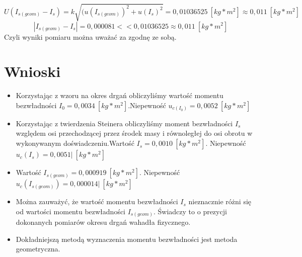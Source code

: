 \documentclass[]{article}
\begin{document}
\[
U(I_{s(geom)} - I_{s}) = k \sqrt{(u(I_{s(geom)})^2 + u( I_{s})^2}
= 0,01036525\:[kg*m^2] \approx 0,011\:[kg*m^2]
\]
\[
|I_{s(geom)} - I_{s}| = 0,000081 << 0,01036525 \approx 0,011\:[kg*m^2]
\]
Czyli wyniki pomiaru można uważać za zgodnę ze sobą.









\section{Wnioski}
\begin{itemize}
        \item Korzystając z wzoru na okres drgań obliczyliśmy wartość momentu bezwładności \(I_{0}=0,0034\:[kg*m^2]\).\newline Niepewność \(u_{c(I_{0})}=0,0052\:[kg*m^2]\)
        
		\item Korzystając z twierdzenia Steinera obliczyliśmy moment bezwładności \(I_{s}\) względem osi przechodzącej przez środek masy i równoległej do osi obrotu w wykonywanym doświadczeniu.\newline Wartość \(I_{s}= 0,0010\: [kg*m^2]\). Niepewność \(u_c(I_{s})=0,0051|\:[kg*m^2]\)
		\item  Wartość \(I_{s(geom)}= 0,000919\: [kg*m^2]\). Niepewność \(u_c(I_{s(geom)})=0,000014|\:[kg*m^2]\)
		\item  Można zauważyć, że wartość momentu bezwładności \(I_{s}\) nieznacznie różni się od wartości momentu bezwładności \(I_{s(geom)}\). Świadczy to o prezycji dokonanych pomiarów okresu drgań wahadła fizycznego.
		\item Dokładniejszą metodą wyznaczenia momentu bezwładności jest metoda geometryczna.
	\end{itemize}
\end{document}
